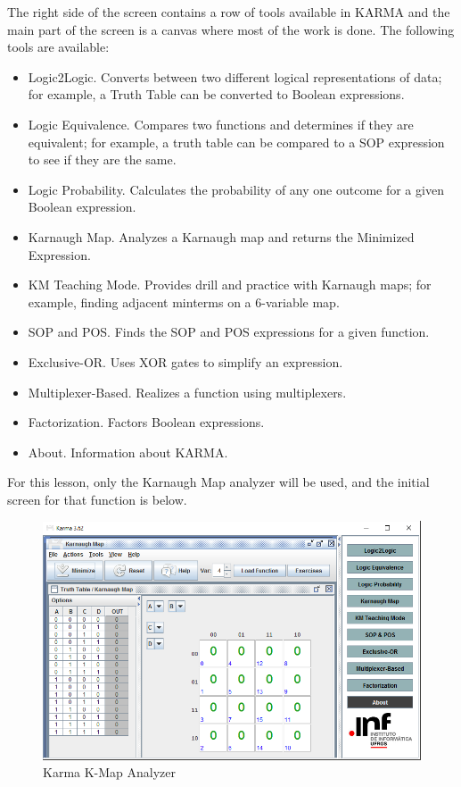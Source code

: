 The right side of the screen contains a row of tools available in \ac{KARMA} and the main part of the screen is a canvas where most of the work is done. The following tools are available:


\begin{itemize}
	\item Logic2Logic. Converts between two different logical representations of data; for example, a Truth Table can be converted to Boolean expressions. 
	\item Logic Equivalence. Compares two functions and determines if they are equivalent; for example, a truth table can be compared to a SOP expression to see if they are the same. 
	\item Logic Probability. Calculates the probability of any one outcome for a given Boolean expression. 
	\item Karnaugh Map. Analyzes a Karnaugh map and returns the Minimized Expression. 
	\item KM Teaching Mode. Provides drill and practice with Karnaugh maps; for example, finding adjacent minterms on a 6-variable map. 
	\item SOP and POS. Finds the SOP and POS expressions for a given function. 
	\item Exclusive-OR. Uses XOR gates to simplify an expression. 
	\item Multiplexer-Based. Realizes a function using multiplexers. 
	\item Factorization. Factors Boolean expressions. 
	\item About. Information about \ac{KARMA}. 
\end{itemize}

For this lesson, only the Karnaugh Map analyzer will be used, and the initial screen for that function is below.

\begin{figure}[H]
	\centering
	\includegraphics[width=\maxwidth{.95\linewidth}]{gfx/07_02}
	\caption{Karma K-Map Analyzer}
	\label{fig:07_02}
\end{figure}

